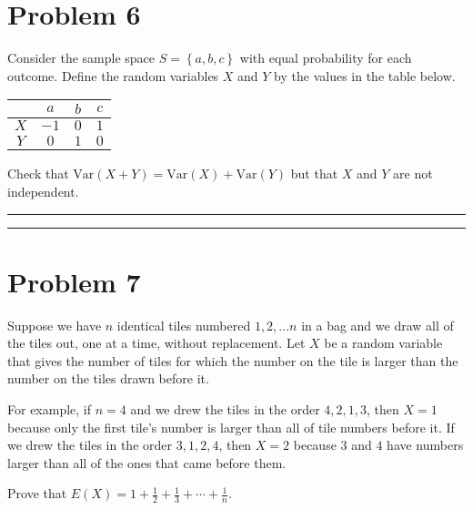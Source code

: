 \documentclass{article}
\theoremstyle{definition}
\newenvironment{solution}{\bigskip\hrule{\hfill}}{\bigskip\hrule{\hfill}} %
\newcommand{\Var}{\text{Var}}
\begin{document}
\section*{Problem 6}

Consider the sample space $S=\left\{a,b,c\right\}$ with equal probability for each outcome. Define the random variables $X$ and $Y$ by the values in the table below. 
\begin{center}
    \begin{tabular}{c|ccc}
            & $ a$ & $b$ & $c$ \\\hline
        $X$ & $-1$ & $0$ & $1$ \\
        $Y$ & $ 0$ & $1$ & $0$ \\
    \end{tabular}
\end{center}
Check that $\Var\left(X+Y\right)=\Var\left(X\right)+\Var\left(Y\right)$ but that $X$ and $Y$ are not independent.
\begin{solution}


\end{solution}


\newpage


\section*{Problem 7}

Suppose we have $n$ identical tiles numbered $1,2,\dots n$ in a bag and we draw all of the tiles out, one at a time, without replacement. Let $X$ be a random variable that gives the number of tiles for which the number on the tile is larger than the number on the tiles drawn before it. \medskip

For example, if $n=4$ and we drew the tiles in the order $4,2,1,3$, then $X=1$ because only the first tile's number is larger than all of tile numbers before it. If we drew the tiles in the order $3,1,2,4$, then $X=2$ because $3$ and $4$ have numbers larger than all of the ones that came before them. \medskip

Prove that $E\left(X\right)=1+\frac{1}{2}+\frac{1}{3}+\cdots+\frac{1}{n}$. \medskip
\end{document}
